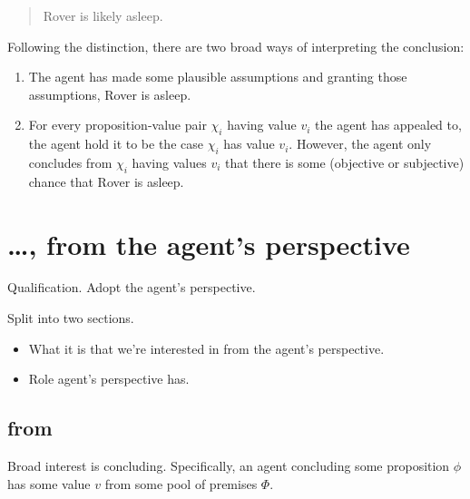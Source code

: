 \begin{note}[Suppositions]
  \begin{quote}
    Rover is likely asleep.
  \end{quote}

  Following the distinction, there are two broad ways of interpreting the conclusion:
  \begin{enumerate}
  \item
    The agent has made some plausible assumptions and granting those assumptions, Rover is asleep.
  \item
    For every proposition-value pair \(\chi_{i}\) having value \(v_{i}\) the agent has appealed to, the agent hold it to be the case \(\chi_{i}\) has value \(v_{i}\).
    However, the agent only concludes from \(\chi_{i}\) having values \(v_{i}\) that there is some (objective or subjective) chance that Rover is asleep.
  \end{enumerate}
\end{note}

\section{\dots, from the agent's perspective}
\label{cha:introduction:sec:agents-perspective}

\begin{note}
  Qualification.
  Adopt the agent's perspective.

  Split into two sections.
  \begin{itemize}
  \item
    What it is that we're interested in from the agent's perspective.
  \item
    Role agent's perspective has.
  \end{itemize}
\end{note}

\subsection{from}
\label{sec:from}

\begin{note}
  Broad interest is concluding.
  Specifically, an agent concluding some proposition \(\phi\) has some value \(v\) from some pool of premises \(\Phi\).
  \end{note}

